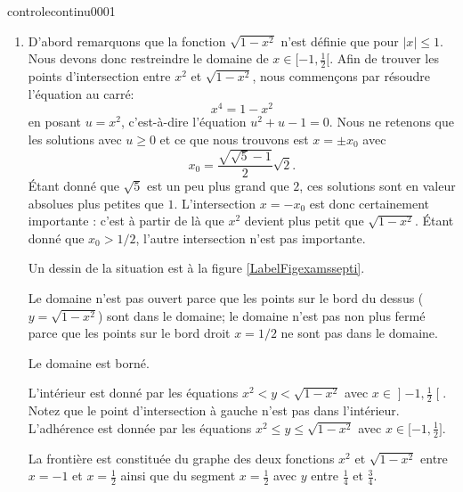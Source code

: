 \begin{corrige}{controlecontinu0001}


\begin{enumerate}
    \item
        D'abord remarquons que la fonction \( \sqrt{1-x^2}\) n'est définie que pour \( | x |\leq 1\). Nous devons donc restreindre le domaine de \( x\in\mathopen[ -1 , \frac{ 1 }{2} [\). Afin de trouver les points d'intersection entre \( x^2\) et \( \sqrt{1-x^2}\), nous commençons par résoudre l'équation au carré:
        \begin{equation}
            x^4=1-x^2
        \end{equation}
        en posant \( u=x^2\), c'est-à-dire l'équation \( u^2+u-1=0\). Nous ne retenons que les solutions avec \( u\geq 0\) et ce que nous trouvons est \( x=\pm x_0\) avec
        \begin{equation}
            x_0=\frac{ \sqrt{\sqrt{5}-1} }{ 2 }\sqrt{2}.
        \end{equation}
        Étant donné que \( \sqrt{5}\) est un peu plus grand que \( 2\), ces solutions sont en valeur absolues plus petites que \( 1\). L'intersection \( x=-x_0\) est donc certainement importante : c'est à partir de là que \( x^2\) devient plus petit que \( \sqrt{1-x^2}\). Étant donné que \( x_0>1/2\), l'autre intersection n'est pas importante.
    
        Un dessin de la situation est à la figure \ref{LabelFigexamssepti}.
        \newcommand{\CaptionFigexamssepti}{Pour l'exercice \ref{exocontrolecontinu0001}}
        

        Le domaine n'est pas ouvert parce que les points sur le bord du dessus (\( y=\sqrt{1-x^2}\)) sont dans le domaine; le domaine n'est pas non plus fermé parce que les points sur le bord droit \( x=1/2\) ne sont pas dans le domaine.

        Le domaine est borné.

        L'intérieur est donné par les équations \( x^2<y<\sqrt{1-x^2}\) avec \( x\in\mathopen] -1 , \frac{ 1 }{2} \mathclose[\). Notez que le point d'intersection à gauche n'est pas dans l'intérieur. L'adhérence est donnée par les équations \( x^2\leq y\leq\sqrt{1-x^2}\) avec \( x\in\mathopen[ -1 , \frac{ 1 }{2} \mathclose]\).

        La frontière est constituée du graphe des deux fonctions \( x^2\) et \( \sqrt{1-x^2}\) entre \( x=-1\) et \( x=\frac{ 1 }{2}\) ainsi que du segment \( x=\frac{ 1 }{2}\) avec \( y\) entre \( \frac{1}{ 4 }\) et \( \frac{ 3 }{ 4 }\).


\end{enumerate}
\end{corrige}
